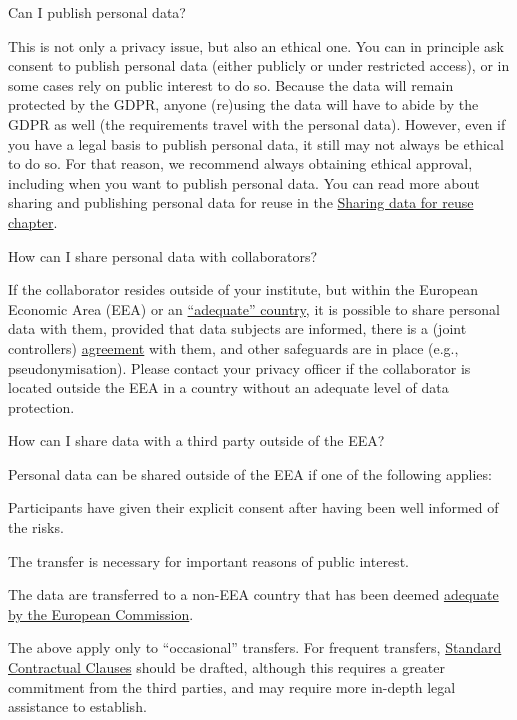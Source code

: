 \documentclass[
]{book}
\begin{document}
Can I publish personal data?

This is not only a privacy issue, but also an ethical one. You can in principle ask consent to publish personal data (either publicly or under restricted access), or in some cases rely on public interest to do so. Because the data will remain protected by the GDPR, anyone (re)using the data will have to abide by the GDPR as well (the requirements travel with the personal data). However, even if you have a legal basis to publish personal data, it still may not always be ethical to do so. For that reason, we recommend always obtaining ethical approval, including when you want to publish personal data. You can read more about sharing and publishing personal data for reuse in the \protect\hyperlink{data-sharing-reuse}{Sharing data for reuse chapter}.

How can I share personal data with collaborators?

If the collaborator resides outside of your institute, but within the European Economic Area (EEA) or an \href{https://ec.europa.eu/info/law/law-topic/data-protection/international-dimension-data-protection/adequacy-decisions_en}{``adequate'' country}, it is possible to share personal data with them, provided that data subjects are informed, there is a (joint controllers) \protect\hyperlink{agreements}{agreement} with them, and other safeguards are in place (e.g., pseudonymisation). Please contact your privacy officer if the collaborator is located outside the EEA in a country without an adequate level of data protection.

How can I share data with a third party outside of the EEA?

Personal data can be shared outside of the EEA if one of the following applies:

Participants have given their explicit consent after having been well informed of the risks.

The transfer is necessary for important reasons of public interest.

The data are transferred to a non-EEA country that has been deemed \href{https://ec.europa.eu/info/law/law-topic/data-protection/international-dimension-data-protection/adequacy-decisions_en}{adequate by the European Commission}.

The above apply only to ``occasional'' transfers. For frequent transfers, \protect\hyperlink{scc}{Standard Contractual Clauses} should be drafted, although this requires a greater commitment from the third parties, and may require more in-depth legal assistance to establish.
\end{document}
